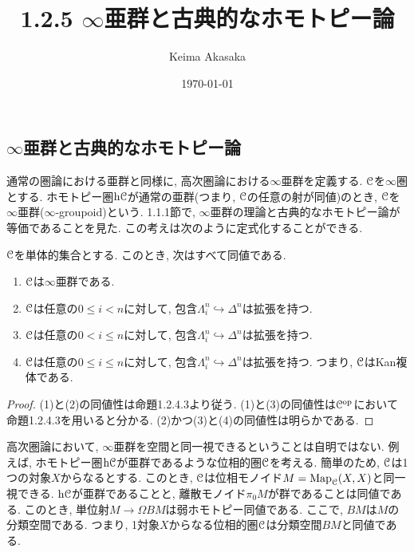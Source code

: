\documentclass[uplatex, a4paper, 14Q, dvipdfmx]{jsreport}
\title{1.2.5 \texorpdfstring{$\infty$}{infty}亜群と古典的なホモトピー論}
\author{Keima Akasaka}
\date{\today}
\begin{document}

\setcounter{chapter}{1}
\setcounter{section}{2} 
\setcounter{subsection}{4}   
\setcounter{subsubsection}{1}

\subsection{\texorpdfstring{$\infty$}{infty}亜群と古典的なホモトピー論}

通常の圏論における亜群と同様に, 高次圏論における$\infty$亜群を定義する. 
$\mathcal{C}$を$\infty$圏とする. 
ホモトピー圏$\mathrm{h}\mathcal{C}$が通常の亜群(つまり, $\mathcal{C}$の任意の射が同値)のとき, $\mathcal{C}$を$\infty$亜群($\infty$-groupoid)という. 
1.1.1節で, $\infty$亜群の理論と古典的なホモトピー論が等価であることを見た. 
この考えは次のように定式化することができる.

\begin{proposition} \label{prop.1.2.5.1}
  $\mathcal{C}$を単体的集合とする. 
  このとき, 次はすべて同値である. 
  \begin{enumerate}
    \item $\mathcal{C}$は$\infty$亜群である. 
    \item $\mathcal{C}$は任意の$0 \leq i < n$に対して, 包含$\Lambda^n_i \hookrightarrow \Delta^n$は拡張を持つ.
    \item $\mathcal{C}$は任意の$0 < i \leq n$に対して, 包含$\Lambda^n_i \hookrightarrow \Delta^n$は拡張を持つ.
    \item $\mathcal{C}$は任意の$0 \leq i \leq n$に対して, 包含$\Lambda^n_i \hookrightarrow \Delta^n$は拡張を持つ.
    つまり, $\mathcal{C}$はKan複体である. 
  \end{enumerate}
\end{proposition}

\begin{proof}
  (1)と(2)の同値性は命題1.2.4.3より従う. 
  (1)と(3)の同値性は$\mathcal{C}^{\mathrm{op}}$において命題1.2.4.3を用いると分かる. 
  (2)かつ(3)と(4)の同値性は明らかである. 
\end{proof}

\begin{remark} \label{rem.1.2.5.2}
  高次圏論において, $\infty$亜群を空間と同一視できるということは自明ではない. 
  例えば, ホモトピー圏$\mathrm{h}\mathcal{C}$が亜群であるような位相的圏$\mathcal{C}$を考える. 
  簡単のため, $\mathcal{C}$は1つの対象$X$からなるとする. 
  このとき, $\mathcal{C}$は位相モノイド$M=\mathrm{Map}_{\mathcal{C}}(X,X)$と同一視できる.
  $\mathrm{h}\mathcal{C}$が亜群であることと, 離散モノイド$\pi_0M$が群であることは同値である. 
  このとき, 単位射$M \to \Omega BM$は弱ホモトピー同値である. 
  ここで, $BM$は$M$の分類空間である. 
  つまり, 1対象$X$からなる位相的圏$\mathcal{C}$は分類空間$BM$と同値である. 
\end{remark}
\end{document}
